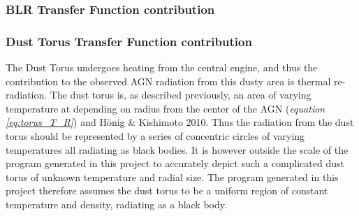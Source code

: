 \documentclass[a4paper, 12pt, twoside]{article}
\begin{document}
\subsubsection{BLR Transfer Function contribution}

\subsubsection{Dust Torus Transfer Function contribution}
The Dust Torus undergoes heating from the central engine, and thus the contribution to the observed AGN radiation from this dusty area is thermal re-radiation. The dust torus is, as described previously, an area of varying temperature at depending on radius from the center of the AGN (\emph{equation \ref{eq:torus_T_R}}) and Hönig \& Kishimoto 2010. Thus the radiation from the dust torus should be represented by a series of concentric circles of varying temperatures all radiating as black bodies. It is however outside the scale of the program generated in this project to accurately depict such a complicated dust torus of unknown temperature and radial size. The program generated in this project therefore assumes the dust torus to be a uniform region of constant temperature and density, radiating as a black body. \\
\\
\end{document}
